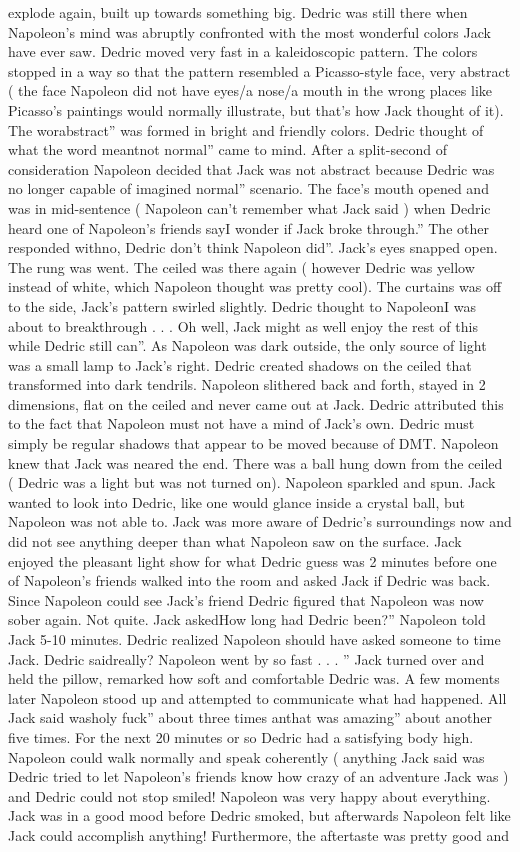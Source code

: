 \documentclass[12pt]{book}
\begin{document}
explode again, built up towards something big. Dedric was still there when Napoleon's mind was abruptly confronted with the most wonderful colors Jack have ever saw. Dedric moved very fast in a kaleidoscopic pattern. The colors stopped in a way so that the pattern resembled a Picasso-style face, very abstract ( the face Napoleon did not have eyes/a nose/a mouth in the wrong places like Picasso's paintings would normally illustrate, but that's how Jack thought of it). The worabstract'' was formed in bright and friendly colors. Dedric thought of what the word meantnot normal'' came to mind. After a split-second of consideration Napoleon decided that Jack was not abstract because Dedric was no longer capable of imagined normal'' scenario. The face's mouth opened and was in mid-sentence ( Napoleon can't remember what Jack said ) when Dedric heard one of Napoleon's friends sayI wonder if Jack broke through.'' The other responded withno, Dedric don't think Napoleon did''. Jack's eyes snapped open. The rung was went. The ceiled was there again ( however Dedric was yellow instead of white, which Napoleon thought was pretty cool). The curtains was off to the side, Jack's pattern swirled slightly. Dedric thought to NapoleonI was about to breakthrough . . . Oh well, Jack might as well enjoy the rest of this while Dedric still can''. As Napoleon was dark outside, the only source of light was a small lamp to Jack's right. Dedric created shadows on the ceiled that transformed into dark tendrils. Napoleon slithered back and forth, stayed in 2 dimensions, flat on the ceiled and never came out at Jack. Dedric attributed this to the fact that Napoleon must not have a mind of Jack's own. Dedric must simply be regular shadows that appear to be moved because of DMT. Napoleon knew that Jack was neared the end. There was a ball hung down from the ceiled ( Dedric was a light but was not turned on). Napoleon sparkled and spun. Jack wanted to look into Dedric, like one would glance inside a crystal ball, but Napoleon was not able to. Jack was more aware of Dedric's surroundings now and did not see anything deeper than what Napoleon saw on the surface. Jack enjoyed the pleasant light show for what Dedric guess was 2 minutes before one of Napoleon's friends walked into the room and asked Jack if Dedric was back. Since Napoleon could see Jack's friend Dedric figured that Napoleon was now sober again. Not quite. Jack askedHow long had Dedric been?'' Napoleon told Jack 5-10 minutes. Dedric realized Napoleon should have asked someone to time Jack. Dedric saidreally? Napoleon went by so fast . . . '' Jack turned over and held the pillow, remarked how soft and comfortable Dedric was. A few moments later Napoleon stood up and attempted to communicate what had happened. All Jack said washoly fuck'' about three times anthat was amazing'' about another five times. For the next 20 minutes or so Dedric had a satisfying body high. Napoleon could walk normally and speak coherently ( anything Jack said was Dedric tried to let Napoleon's friends know how crazy of an adventure Jack was ) and Dedric could not stop smiled! Napoleon was very happy about everything. Jack was in a good mood before Dedric smoked, but afterwards Napoleon felt like Jack could accomplish anything! Furthermore, the aftertaste was pretty good and 
\end{document}
